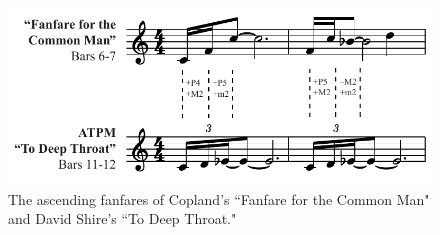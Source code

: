 \begin{figure}
    \centering
    \includegraphics[width=1\linewidth]{img/president-common.pdf}
    \caption{The ascending fanfares of Copland's ``Fanfare for the Common Man" and David Shire's ``To Deep Throat."}
    \label{fig:president-common}
\end{figure}


